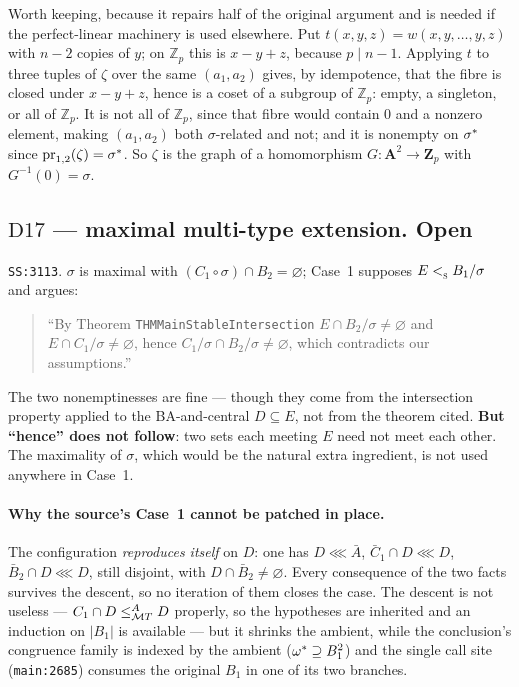 \begin{entry}\label{ent:zeta}
Worth keeping, because it repairs half of the original argument and is needed
if the perfect-linear machinery is used elsewhere. Put
$t(x,y,z)=w(x,y,\dots,y,z)$ with $n-2$ copies of $y$; on $\mathbb Z_{p}$ this
is $x-y+z$, because $p\mid n-1$. Applying $t$ to three tuples of $\zeta$ over
the same $(a_{1},a_{2})$ gives, by idempotence, that the fibre is closed under
$x-y+z$, hence is a coset of a subgroup of $\mathbb Z_{p}$: empty, a singleton,
or all of $\mathbb Z_{p}$. It is not all of $\mathbb Z_{p}$, since that fibre
would contain $0$ and a nonzero element, making $(a_{1},a_{2})$ both
$\sigma$-related and not; and it is nonempty on $\sigma^{*}$ since
$\operatorname*{pr}_{1,2}(\zeta)=\sigma^{*}$. So $\zeta$ is the graph of a homomorphism
$G\colon\mathbf A^{2}\to\mathbf Z_{p}$ with $G^{-1}(0)=\sigma$.
\end{entry}

\subsection{$\mathrm D{17}$ --- maximal multi-type extension. \textbf{Open}}
\label{sec:D17}

\texttt{SS:3113}. $\sigma$ is maximal with $(C_{1}\circ\sigma)\cap
B_{2}=\varnothing$; Case~1 supposes $E<_{\textup{\textsc{s}}}^{}B_{1}/\sigma$ and argues:

\begin{quote}\small
``By Theorem \texttt{THMMainStableIntersection} $E\cap B_{2}/\sigma\neq
\varnothing$ and $E\cap C_{1}/\sigma\neq\varnothing$, hence
$C_{1}/\sigma\cap B_{2}/\sigma\neq\varnothing$, which contradicts our
assumptions.''
\end{quote}

The two nonemptinesses are fine --- though they come from the intersection
property applied to the BA-and-central $D\subseteq E$, not from the theorem
cited. \textbf{But ``hence'' does not follow}: two sets each meeting $E$ need
not meet each other. The maximality of $\sigma$, which would be the natural
extra ingredient, is not used anywhere in Case~1.

\paragraph{Why the source's Case~1 cannot be patched in place.}
The configuration \emph{reproduces itself} on $D$: one has $D\lll\bar A$,
$\bar C_{1}\cap D\lll D$, $\bar B_{2}\cap D\lll D$, still disjoint, with
$D\cap\bar B_{2}\neq\varnothing$. Every consequence of the two facts survives
the descent, so no iteration of them closes the case. The descent is not
useless --- $C_{1}\cap D\le_{\mathcal MT}^{A}D$ properly, so the hypotheses are
inherited and an induction on $|B_{1}|$ is available --- but it shrinks the
ambient, while the conclusion's congruence family is indexed by the ambient
($\omega^{*}\supseteq B_{1}^{2}$) and the single call site
(\texttt{main:2685}) consumes the original $B_{1}$ in one of its two branches.

